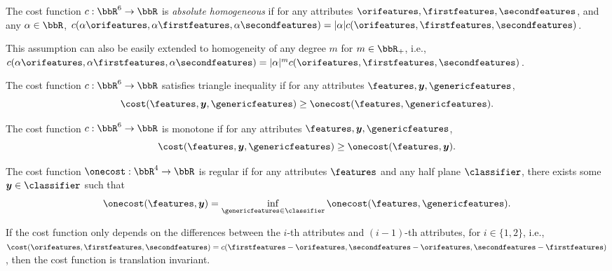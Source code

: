 \begin{assumption}\label{def: absolute homogenous c}
    The cost function $c : \bbR^6 \to \bbR$ is \emph{absolute homogeneous} if for any attributes $\orifeatures, \firstfeatures,\secondfeatures$, and any $\alpha\in \bbR$, $c(\alpha\orifeatures, \alpha\firstfeatures,\alpha\secondfeatures) = |\alpha|c(\orifeatures, \firstfeatures,\secondfeatures)$.
\end{assumption}
This assumption can also be easily extended to homogeneity of any degree $m$ for $m\in \bbR_+$, i.e., $c(\alpha\orifeatures, \alpha\firstfeatures,\alpha\secondfeatures) = |\alpha|^m c(\orifeatures, \firstfeatures,\secondfeatures)$.

\begin{assumption}\label{def: trainagle inequality}
    The cost function $c : \bbR^6 \to \bbR$ satisfies triangle inequality if for any attributes $\features,  \boldsymbol{y}, \genericfeatures$, 
    $$\cost(\features, \boldsymbol{y}, \genericfeatures)\geq \onecost(\features,  \genericfeatures).$$ 
\end{assumption}

\begin{assumption}[monotonicity]\label{def: monotone}
    The cost function $c : \bbR^6 \to \bbR$ is monotone if for any attributes $\features, \boldsymbol{y}, \genericfeatures$, 
    $$\cost(\features, \boldsymbol{y}, \genericfeatures)\geq \onecost(\features,  \boldsymbol{y}).$$ 
\end{assumption}


\begin{assumption}[regular]\label{def: existence of minimum cost}
    The cost function $\onecost: \bbR^4 \to \bbR$ is regular if for any attributes $\features$ and any half plane $\classifier$, there exists some $\boldsymbol{y}\in \classifier$ such that 
    $$\onecost(\features, \boldsymbol{y})=\inf_{\genericfeatures\in \classifier}\onecost(\features,\genericfeatures).$$    
\end{assumption}





If the cost function only depends on the differences between the $i$-th attributes and $(i-1)$-th attributes, for $i\in \{1,2\}$, i.e., 
$\cost(\orifeatures,\firstfeatures,\secondfeatures)=c(\firstfeatures-\orifeatures,\secondfeatures -\orifeatures, \secondfeatures-\firstfeatures)$, then the cost function is translation invariant. 


